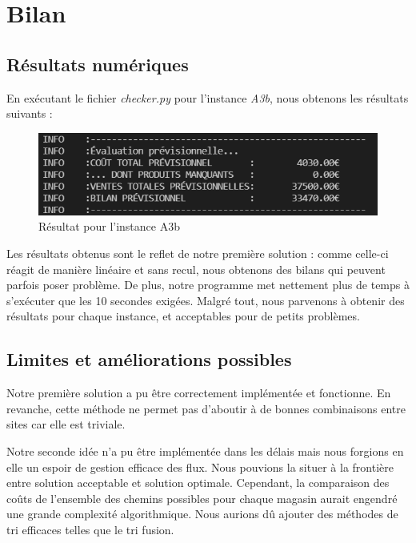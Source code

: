 \documentclass[12pt, a4paper]{article}
\begin{document}

\section{Bilan}
\subsection{Résultats numériques}
En exécutant le fichier \emph{checker.py} pour l'instance \emph{A3b}, nous obtenons les résultats suivants :

\begin{figure}[h] %
    \centering
    \includegraphics[width=1\textwidth]{checker} %
    \caption{Résultat pour l'instance A3b} %
    \label{fig:checker} %
\end{figure}

Les résultats obtenus sont le reflet de notre première solution : comme celle-ci réagit de manière linéaire et sans recul, nous obtenons des bilans qui peuvent parfois poser problème. De plus, notre programme met nettement plus de temps à s'exécuter que les 10 secondes exigées. Malgré tout, nous parvenons à obtenir des résultats pour chaque instance, et acceptables pour de petits problèmes.
\subsection{Limites et améliorations possibles}
Notre première solution a pu être correctement implémentée et fonctionne. En revanche, cette méthode ne permet pas d'aboutir à de bonnes combinaisons entre sites car elle est triviale.

Notre seconde idée n'a pu être implémentée dans les délais mais nous forgions en elle un espoir de gestion efficace des flux. Nous pouvions la situer à la frontière entre solution acceptable et solution optimale. Cependant, la comparaison des coûts de l'ensemble des chemins possibles pour chaque magasin aurait engendré une grande complexité algorithmique. Nous aurions dû ajouter des méthodes de tri efficaces telles que le tri fusion.

\end{document}
